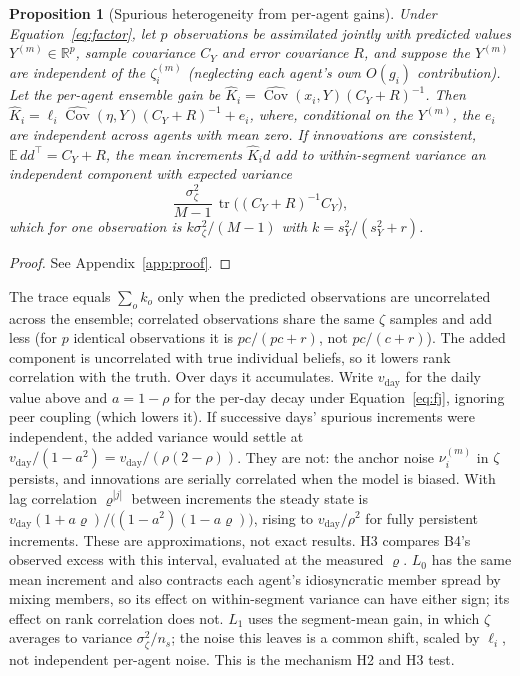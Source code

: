 \documentclass[10pt]{article}
\newtheorem{proposition}{Proposition}
\theoremstyle{remark}
\newcommand{\R}{\mathbb{R}}
\newcommand{\E}{\mathbb{E}}
\newcommand{\Cov}{\operatorname{Cov}}
\newcommand{\tr}{\operatorname{tr}}
\begin{document}
\begin{proposition}[Spurious heterogeneity from per-agent gains]
\label{prop:noise}
Under Equation~\eqref{eq:factor}, let $p$ observations be assimilated jointly with predicted values $Y^{(m)}\in\R^p$, sample covariance $C_Y$ and error covariance $R$, and suppose the $Y^{(m)}$ are independent of the $\zeta_i^{(m)}$ (neglecting each agent's own $O(g_i)$ contribution). Let the per-agent ensemble gain be $\hat K_i=\widehat{\Cov}(x_i,Y)(C_Y+R)^{-1}$. Then $\hat K_i=\ell_i\widehat{\Cov}(\eta,Y)(C_Y+R)^{-1}+e_i$, where, conditional on the $Y^{(m)}$, the $e_i$ are independent across agents with mean zero. If innovations are consistent, $\E\,dd^\top=C_Y+R$, the mean increments $\hat K_i d$ add to within-segment variance an independent component with expected variance
\[
\frac{\sigma_\zeta^2}{M-1}\,\tr\!\big((C_Y+R)^{-1}C_Y\big),
\]
which for one observation is $k\sigma_\zeta^2/(M-1)$ with $k=s_Y^2/(s_Y^2+r)$.
\end{proposition}
\begin{proof}
See Appendix~\ref{app:proof}.
\end{proof}

The trace equals $\sum_o k_o$ only when the predicted observations are uncorrelated across the ensemble; correlated observations share the same $\zeta$ samples and add less (for $p$ identical observations it is $pc/(pc+r)$, not $pc/(c+r)$). The added component is uncorrelated with true individual beliefs, so it lowers rank correlation with the truth. Over days it accumulates. Write $v_{\mathrm{day}}$ for the daily value above and $a=1-\rho$ for the per-day decay under Equation~\eqref{eq:fj}, ignoring peer coupling (which lowers it). If successive days' spurious increments were independent, the added variance would settle at $v_{\mathrm{day}}/(1-a^2)=v_{\mathrm{day}}/(\rho(2-\rho))$. They are not: the anchor noise $\nu_i^{(m)}$ in $\zeta$ persists, and innovations are serially correlated when the model is biased. With lag correlation $\varrho^{|j|}$ between increments the steady state is $v_{\mathrm{day}}(1+a\varrho)/\big((1-a^2)(1-a\varrho)\big)$, rising to $v_{\mathrm{day}}/\rho^2$ for fully persistent increments. These are approximations, not exact results. H3 compares B4's observed excess with this interval, evaluated at the measured $\varrho$. $L_0$ has the same mean increment and also contracts each agent's idiosyncratic member spread by mixing members, so its effect on within-segment variance can have either sign; its effect on rank correlation does not. $L_1$ uses the segment-mean gain, in which $\zeta$ averages to variance $\sigma_\zeta^2/n_s$; the noise this leaves is a common shift, scaled by $\ell_i$, not independent per-agent noise. This is the mechanism H2 and H3 test.
\end{document}
